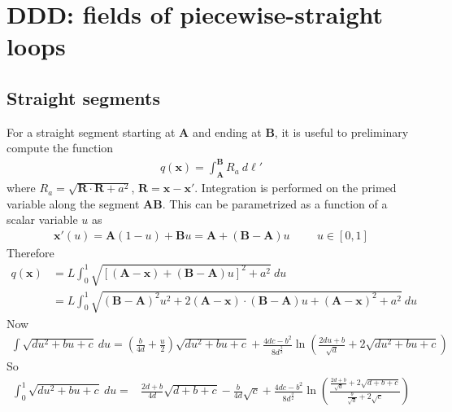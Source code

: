 
\chapter{DDD: fields of piecewise-straight loops}



\section{Straight segments}
For a straight segment starting at $\bm A$ and ending at $\bm B$, it is useful to preliminary compute the function
\begin{align}
q(\bm x)=\int_{\bm A}^{\bm B}R_a\ d\ell'
\end{align}
where $R_a=\sqrt{\bm R\cdot\bm R+a^2}$, $\bm R=\bm x-\bm x'$. Integration is performed on the primed variable along the segment $\bm A\bm B$. This can be parametrized as a function of a scalar variable $u$ as
\begin{align}
\bm x'(u)=\bm A(1-u)+\bm Bu=\bm A+(\bm B-\bm A)u\hspace{1cm} u\in[0,1]
\end{align}
Therefore
\begin{align}
q(\bm x)&=L\int_0^1\sqrt{[(\bm A-\bm x)+(\bm B-\bm A)u]^2+a^2}\ du\nonumber\\
&=L\int_0^1\sqrt{(\bm B-\bm A)^2u^2+2(\bm A-\bm x)\cdot(\bm B-\bm A)u+(\bm A-\bm x)^2+a^2}\ du
\end{align}
Now
\begin{align}
\int\sqrt{du^2+bu+c}\ du=\left(\frac{b}{4d}+\frac{u}{2}\right)\sqrt{du^2+bu+c}+\frac{4dc-b^2}{8d^\frac{3}{2}}\ln\left(\frac{2du+b}{\sqrt{d}}+2\sqrt{du^2+bu+c}\right)
\end{align}
So
\begin{align}
\int_0^1\sqrt{du^2+bu+c}\ du=&\frac{2d+b}{4d}\sqrt{d+b+c}-\frac{b}{4d}\sqrt{c}+\frac{4dc-b^2}{8d^\frac{3}{2}}\ln\left(\frac{\frac{2d+b}{\sqrt{d}}+2\sqrt{d+b+c}}{\frac{b}{\sqrt{d}}+2\sqrt{c}}\right)
\end{align}

